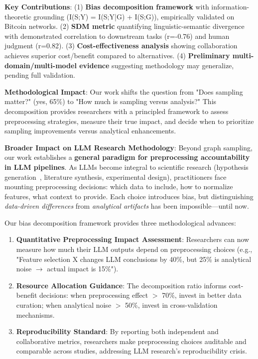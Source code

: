 \documentclass[conference]{IEEEtran}
\begin{document}
\textbf{Key Contributions}: (1) \textbf{Bias decomposition framework} with information-theoretic grounding (I(S;Y) = I(S;Y|G) + I(S;G)), empirically validated on Bitcoin networks. (2) \textbf{SDM metric} quantifying linguistic-semantic divergence with demonstrated correlation to downstream tasks (r=-0.76) and human judgment (r=0.82). (3) \textbf{Cost-effectiveness analysis} showing collaboration achieves superior cost/benefit compared to alternatives. (4) \textbf{Preliminary multi-domain/multi-model evidence} suggesting methodology may generalize, pending full validation.

\textbf{Methodological Impact}: Our work shifts the question from "Does sampling matter?" (yes, 65\%) to "How much is sampling versus analysis?" This decomposition provides researchers with a principled framework to assess preprocessing strategies, measure their true impact, and decide when to prioritize sampling improvements versus analytical enhancements.

\textbf{Broader Impact on LLM Research Methodology}: Beyond graph sampling, our work establishes a \textbf{general paradigm for preprocessing accountability in LLM pipelines}. As LLMs become integral to scientific research (hypothesis generation~\cite{wang2023scientific}, literature synthesis, experimental design), practitioners face mounting preprocessing decisions: which data to include, how to normalize features, what context to provide. Each choice introduces bias, but distinguishing \textit{data-driven differences} from \textit{analytical artifacts} has been impossible---until now.

Our bias decomposition framework provides three methodological advances:
\begin{enumerate}
    \item \textbf{Quantitative Preprocessing Impact Assessment}: Researchers can now measure how much their LLM outputs depend on preprocessing choices (e.g., "Feature selection X changes LLM conclusions by 40\%, but 25\% is analytical noise $\rightarrow$ actual impact is 15\%").
    \item \textbf{Resource Allocation Guidance}: The decomposition ratio informs cost-benefit decisions: when preprocessing effect $>$ 70\%, invest in better data curation; when analytical noise $>$ 50\%, invest in cross-validation mechanisms.
    \item \textbf{Reproducibility Standard}: By reporting both independent and collaborative metrics, researchers make preprocessing choices auditable and comparable across studies, addressing LLM research's reproducibility crisis.
\end{enumerate}
\end{document}
